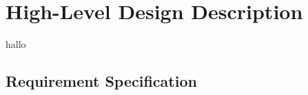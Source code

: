 \documentclass[12pt,a4paper,titlepage,oneside]{article}
\begin{document}
\MakeTitleAndTOC
  \newpage


\section{High-Level Design Description}

hallo
\subsection{Requirement Specification}
\end{document}
